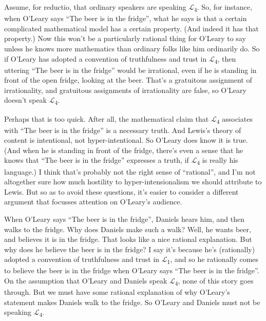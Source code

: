 \documentclass[
  10pt,
  letterpaper,
  DIV=11,
  numbers=noendperiod,
  twoside]{scrartcl}
\begin{document}
Assume, for reductio, that ordinary speakers are speaking
\(\mathcal{L}\)\textsubscript{4}. So, for instance, when O'Leary says
``The beer is in the fridge'', what he says is that a certain
complicated mathematical model has a certain property. (And indeed it
has that property.) Now this won't be a particularly rational thing for
O'Leary to say unless he knows more mathematics than ordinary folks like
him ordinarily do. So if O'Leary has adopted a convention of
truthfulness and trust in \(\mathcal{L}\)\textsubscript{4}, then
uttering ``The beer is in the fridge'' would be irrational, even if he
is standing in front of the open fridge, looking at the beer. That's a
gratuitous assignment of irrationality, and gratuitous assignments of
irrationality are false, so O'Leary doesn't speak
\(\mathcal{L}\)\textsubscript{4}.

Perhaps that is too quick. After all, the mathematical claim that
\(\mathcal{L}\)\textsubscript{4} associates with ``The beer is in the
fridge'' is a necessary truth. And Lewis's theory of content is
intentional, not hyper-intentional. So O'Leary does know it is true.
(And when he is standing in front of the fridge, there's even a sense
that he knows that ``The beer is in the fridge'' expresses a truth, if
\(\mathcal{L}\)\textsubscript{4} is really his language.) I think that's
probably not the right sense of ``rational'', and I'm not altogether
sure how much hostility to hyper-intensionalism we should attribute to
Lewis. But so as to avoid these questions, it's easier to consider a
different argument that focusses attention on O'Leary's audience.

When O'Leary says ``The beer is in the fridge'', Daniels hears him, and
then walks to the fridge. Why does Daniels make such a walk? Well, he
wants beer, and believes it is in the fridge. That looks like a nice
rational explanation. But why does he believe the beer is in the fridge?
I say it's because he's (rationally) adopted a convention of
truthfulness and trust in \(\mathcal{L}\)\textsubscript{1}, and so he
rationally comes to believe the beer is in the fridge when O'Leary says
``The beer is in the fridge''. On the assumption that O'Leary and
Daniels speak \(\mathcal{L}\)\textsubscript{4}, none of this story goes
through. But we must have some rational explanation of why O'Leary's
statement makes Daniels walk to the fridge. So O'Leary and Daniels must
not be speaking \(\mathcal{L}\)\textsubscript{4}.
\end{document}
